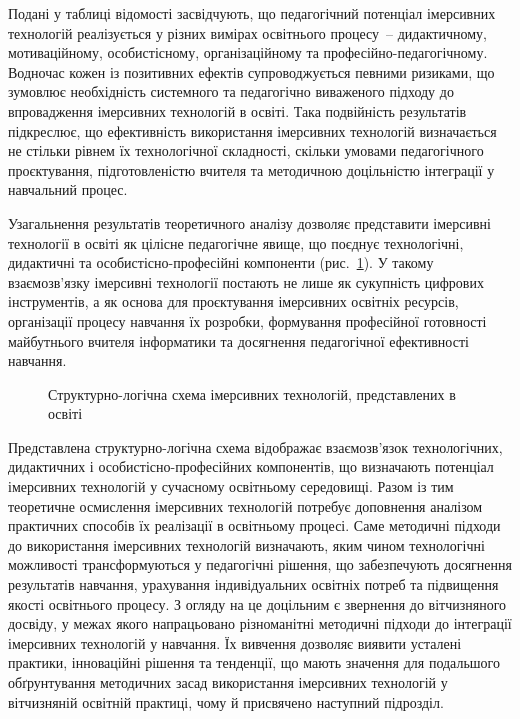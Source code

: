 Подані у таблиці відомості засвідчують, що педагогічний потенціал імерсивних технологій реалізується у різних вимірах освітнього процесу~-- дидактичному, мотиваційному, особистісному, організаційному та професійно-педагогічному. Водночас кожен із позитивних ефектів супроводжується певними ризиками, що зумовлює необхідність системного та педагогічно виваженого підходу до впровадження імерсивних технологій в освіті. Така подвійність результатів підкреслює, що ефективність використання імерсивних технологій визначається не стільки рівнем їх технологічної складності, скільки умовами педагогічного проєктування, підготовленістю вчителя та методичною доцільністю інтеграції у навчальний процес.

Узагальнення результатів теоретичного аналізу дозволяє представити імерсивні технології в освіті як цілісне педагогічне явище, що поєднує технологічні, дидактичні та особистісно-професійні компоненти (рис.~\ref{fig:1.7}). У такому взаємозв'язку імерсивні технології постають не лише як сукупність цифрових інструментів, а як основа для проєктування імерсивних освітніх ресурсів, організації процесу навчання їх розробки, формування професійної готовності майбутнього вчителя інформатики та досягнення педагогічної ефективності навчання.

\begin{figure}[!h]
\centering

\caption{Структурно-логічна схема імерсивних технологій, представлених в освіті}
\label{fig:1.7}
\end{figure}

Представлена структурно-логічна схема відображає взаємозв'язок технологічних, дидактичних і особистісно-професійних компонентів, що визначають потенціал імерсивних технологій у сучасному освітньому середовищі. Разом із тим теоретичне осмислення імерсивних технологій потребує доповнення аналізом практичних способів їх реалізації в освітньому процесі. Саме методичні підходи до використання імерсивних технологій визначають, яким чином технологічні можливості трансформуються у педагогічні рішення, що забезпечують досягнення результатів навчання, урахування індивідуальних освітніх потреб та підвищення якості освітнього процесу. З огляду на це доцільним є звернення до вітчизняного досвіду, у межах якого напрацьовано різноманітні методичні підходи до інтеграції імерсивних технологій у навчання. Їх вивчення дозволяє виявити усталені практики, інноваційні рішення та тенденції, що мають значення для подальшого обґрунтування методичних засад використання імерсивних технологій у вітчизняній освітній практиці, чому й присвячено наступний підрозділ.

